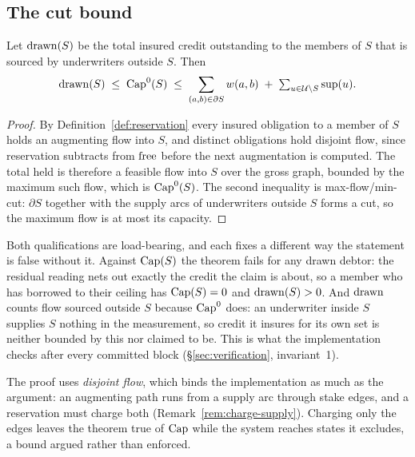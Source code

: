 \subsection{The cut bound}

\begin{theorem}
\label{thm:cut}
Let $\mathrm{drawn}(S)$ be the total insured credit outstanding to the members of $S$ that is
sourced by underwriters outside $S$. Then
\[
  \mathrm{drawn}(S) \;\le\; \mathrm{Cap}^{0}(S) \;\le\; \sum_{(a,b)\in\partial S} w(a,b)
  \;+\; \textstyle\sum_{u\in\mathcal{U}\setminus S}\mathrm{sup}(u).
\]
\end{theorem}

\begin{proof}
By Definition~\ref{def:reservation} every insured obligation to a member of $S$ holds an
augmenting flow into $S$, and distinct obligations hold disjoint flow, since reservation
subtracts from $\mathrm{free}$ before the next augmentation is computed. The total held is
therefore a feasible flow into $S$ over the gross graph, bounded by the maximum such flow,
which is $\mathrm{Cap}^{0}(S)$. The second inequality is max-flow/min-cut: $\partial S$ together
with the supply arcs of underwriters outside $S$ forms a cut, so the maximum flow is at
most its capacity.
\end{proof}

\begin{remark}
\label{rem:cut-gross}
Both qualifications are load-bearing, and each fixes a different way the statement is
false without it. Against $\mathrm{Cap}(S)$ the theorem fails for any drawn debtor: the residual
reading nets out exactly the credit the claim is about, so a member who has borrowed to
their ceiling has $\mathrm{Cap}(S)=0$ and $\mathrm{drawn}(S)>0$. And $\mathrm{drawn}$ counts flow sourced
outside $S$ because $\mathrm{Cap}^{0}$ does: an underwriter inside $S$ supplies $S$ nothing in
the measurement, so credit it insures for its own set is neither bounded by this nor
claimed to be. This is what the implementation checks after every committed block
(\S\ref{sec:verification}, invariant~1).
\end{remark}

The proof uses \emph{disjoint flow}, which binds the implementation as much as the
argument: an augmenting path runs from a supply arc through stake edges, and a reservation
must charge both (Remark~\ref{rem:charge-supply}). Charging only the edges leaves the
theorem true of $\mathrm{Cap}$ while the system reaches states it excludes, a bound argued rather
than enforced.

